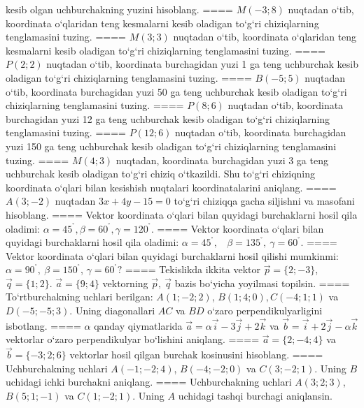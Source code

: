 kesib olgan uchburchakning yuzini hisoblang.
====
$M (-3;8) $ nuqtadan o‘tib, koordinata o‘qlaridan
teng kesmalarni kesib oladigan to‘g‘ri chiziqlarning tenglamasini tuzing.
====
$M (3;3)$ nuqtadan o‘tib, koordinata o‘qlaridan teng
kesmalarni kesib oladigan to‘g‘ri chiziqlarning tenglamasini tuzing.
====
$P (2;2)$ nuqtadan o‘tib, koordinata burchagidan
yuzi 1 ga teng uchburchak kesib oladigan to‘g‘ri chiziqlarning
tenglamasini tuzing.
====
$B (-5;5)$ nuqtadan o‘tib, koordinata burchagidan
yuzi 50 ga teng uchburchak kesib oladigan to‘g‘ri chiziqlarning tenglamasini
tuzing.
====
$P (8;6) $ nuqtadan o‘tib, koordinata burchagidan
yuzi 12 ga teng uchburchak kesib oladigan to‘g‘ri chiziqlarning tenglamasini
tuzing.
====
$P (12;6)$ nuqtadan o‘tib, koordinata burchagidan
yuzi 150 ga teng uchburchak kesib oladigan to‘g‘ri chiziqlarning
tenglamasini tuzing.
====
$M (4;3) $ nuqtadan, koordinata burchagidan
yuzi 3 ga teng uchburchak kesib oladigan to‘g‘ri chiziq o‘tkazildi.
Shu to‘g‘ri chiziqning koordinata o‘qlari bilan kesishish nuqtalari
koordinatalarini aniqlang.
====
$A (3;-2) $ nuqtadan $3x+4y-15=0$ to‘g‘ri chiziqqa
gacha siljishni va masofani hisoblang.
====
Vektor koordinata o‘qlari bilan quyidagi burchaklarni hosil qila oladimi:
$\alpha = 45^{{^\circ}},\beta = 60^{{^\circ}},\gamma = 120^{{^\circ}}$.
====
Vektor koordinata o‘qlari bilan quyidagi burchaklarni hosil qila oladimi:
$\alpha = 45^{{^\circ}},\ \ \ \ \beta = 135^{{^\circ}},\ \gamma = 60^{{^\circ}}$.
====
Vektor koordinata o‘qlari bilan quyidagi burchaklarni hosil qilishi
mumkinmi: $\alpha = 90^{{^\circ}},\ \beta = 150^{{^\circ}}$,
$\gamma = 60^{{^\circ}}?$
====
Tekislikda ikkita vektor
$\overrightarrow{p} = \{ 2; - 3\}$, $\overrightarrow{q} = \{ 1;2\}$.
$\overrightarrow{a} = \{9;4\}$ vektorning
$\overrightarrow{p},\ \overrightarrow{q}$ bazis bo‘yicha yoyilmasi topilsin.
====
To‘rtburchakning uchlari berilgan:
$A (1; - 2;2) $, $B (1;4;0),C (- 4;1;1) $ va $D (- 5; -5;3) $. Uning diagonallari $AC$ va $BD$ o‘zaro
perpendikulyarligini isbotlang.
====
$\alpha$
qanday qiymatlarida 
$\overrightarrow{a} = \alpha\overrightarrow{i} - 3\overrightarrow{j} + 2\overrightarrow{k}$
va
$\overrightarrow{b} = \overrightarrow{i} + 2\overrightarrow{j} - \alpha\overrightarrow{k}$
vektorlar o‘zaro perpendikulyar bo‘lishini aniqlang.
====
$\overrightarrow{a} = \{ 2; - 4;4\}$ va $\overrightarrow{b} = \{ - 3;2;6\}$
vektorlar hosil qilgan burchak kosinusini hisoblang.
====
Uchburchakning uchlari
$A (- 1; - 2;4) $, $B (- 4; - 2;0) $ va $C (3; -2;1) $. Uning $B$ uchidagi
ichki burchakni aniqlang.
====
Uchburchakning uchlari
$A (3;2; 3) $, $B (5;1; - 1) $ va $C (1; -2;1) $. Uning $A$ uchidagi tashqi burchagi aniqlansin.

